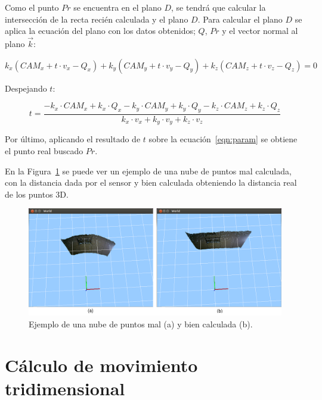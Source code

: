 Como el punto $Pr$ se encuentra en el plano $D$, se tendrá que calcular la intersección de la recta recién calculada y el plano $D$. Para calcular el plano $D$ se aplica la ecuación del plano con los datos obtenidos; $Q$, $Pr$ y el vector normal al plano $\vec{k}$:

\begin{equation}
k_{x}(CAM_{x}+t\cdot v_{x}-Q_{x})+k_{y}(CAM_{y}+t\cdot v_{y}-Q_{y})+k_{z}(CAM_{z}+t\cdot v_{z}-Q_{z})=0
\end{equation}

Despejando $t$:

\begin{equation}
t=\frac{-k_{x}\cdot CAM_{x}+k_{x}\cdot Q_{x}-k_{y}\cdot CAM_{y}+k_{y}\cdot Q_{y}-k_{z}\cdot CAM_{z}+k_{z}\cdot Q_{z}}{k_{x}\cdot v_{x}+k_{y}\cdot v_{y}+k_{z}\cdot v_{z}}
\end{equation}

Por último, aplicando el resultado de $t$ sobre la ecuación~\ref{eqn:param} se obtiene el punto real buscado $Pr$.

En la Figura~\ref{fig:pointcloud-plane} se puede ver un ejemplo de una nube de puntos mal calculada, con la distancia dada por el sensor y bien calculada obteniendo la distancia real de los puntos 3D.

\begin{figure}[th]
\centering
\includegraphics[scale=0.36]{Figures/plano-distancia.png}
\decoRule
\caption[Ejemplo de una nube de puntos mal y bien calculada] {Ejemplo de una nube de puntos mal (a) y bien calculada (b).}
\label{fig:pointcloud-plane}
\end{figure}

\section{Cálculo de movimiento tridimensional}


